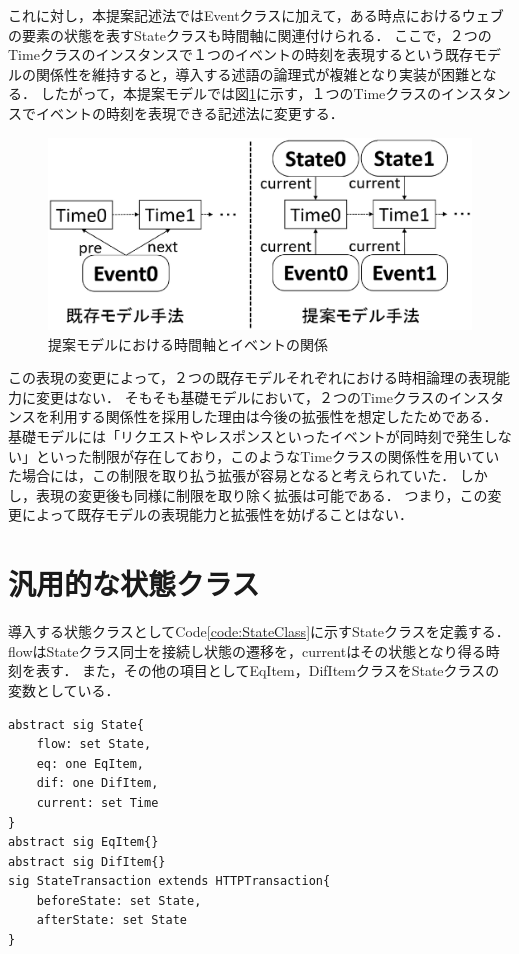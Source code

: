 \documentclass[12pt,a4paper]{jbook}
\begin{document}
これに対し，本提案記述法ではEventクラスに加えて，ある時点におけるウェブの要素の状態を表すStateクラスも時間軸に関連付けられる．
ここで，２つのTimeクラスのインスタンスで１つのイベントの時刻を表現するという既存モデルの関係性を維持すると，導入する述語の論理式が複雑となり実装が困難となる．
したがって，本提案モデルでは図\ref{fig:ProposedModel-TimeClass}に示す，１つのTimeクラスのインスタンスでイベントの時刻を表現できる記述法に変更する．

\begin{figure}[htb]
\centering
\includegraphics[width=450pt]{./fig/ProposedModel-TimeClass.eps}
\caption{提案モデルにおける時間軸とイベントの関係}
\label{fig:ProposedModel-TimeClass}
\end{figure}

この表現の変更によって，２つの既存モデルそれぞれにおける時相論理の表現能力に変更はない．
そもそも基礎モデルにおいて，２つのTimeクラスのインスタンスを利用する関係性を採用した理由は今後の拡張性を想定したためである．
基礎モデルには「リクエストやレスポンスといったイベントが同時刻で発生しない」といった制限が存在しており，このようなTimeクラスの関係性を用いていた場合には，この制限を取り払う拡張が容易となると考えられていた．
しかし，表現の変更後も同様に制限を取り除く拡張は可能である．
つまり，この変更によって既存モデルの表現能力と拡張性を妨げることはない．

\section{汎用的な状態クラス}
\label{sec:state-class}
導入する状態クラスとしてCode\ref{code:StateClass}に示すStateクラスを定義する．
flowはStateクラス同士を接続し状態の遷移を，currentはその状態となり得る時刻を表す．
また，その他の項目としてEqItem，DifItemクラスをStateクラスの変数としている．
\begin{lstlisting}[caption=Stateクラス, label=code:StateClass]
abstract sig State{
	flow: set State,
	eq: one EqItem,
	dif: one DifItem,
	current: set Time
}
abstract sig EqItem{}
abstract sig DifItem{}
sig StateTransaction extends HTTPTransaction{
	beforeState: set State,
	afterState: set State
}
\end{lstlisting}
\end{document}
